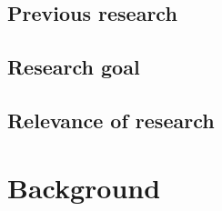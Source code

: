 \documentclass[a4paper, 10pt, english, onecolumn]{article}
\begin{document}
\subsection{Previous research}

\subsection{Research goal}
%


\subsection{Relevance of research}

\section{Background}
\end{document}
